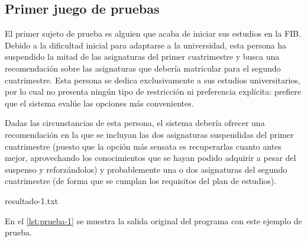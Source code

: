 
\subsection{Primer juego de pruebas} \label{sec:prueba-1}

El primer sujeto de prueba es alguien que acaba de iniciar sus estudios en la 
FIB. Debido a la dificultad inicial para adaptarse a la universidad, esta 
persona ha suspendido la mitad de las asignaturas del primer cuatrimestre y 
busca una recomendación sobre las asignaturas que debería matricular para el 
segundo cuatrimestre. Esta persona se dedica exclusivamente a sus estudios 
universitarios, por lo cual no presenta ningún tipo de restricción ni 
preferencia explícita: prefiere que el sistema evalúe las opciones más 
convenientes. 

Dadas las circunstancias de esta persona, el sistema debería ofrecer una 
recomendación en la que se incluyan las dos asignaturas suspendidas del primer 
cuatrimestre (puesto que la opción más sensata es recuperarlas cuanto antes 
mejor, aprovechando los conocimientos que se hayan podido adquirir a pesar del 
suspenso y reforzándolos) y probablemente una o dos asignaturas del segundo 
cuatrimestre (de forma que se cumplan los requisitos del plan de estudios).

%
    {resultado-1.txt}

En el \autoref{lst:prueba-1} se muestra la salida original del programa con 
este ejemplo de prueba. 


